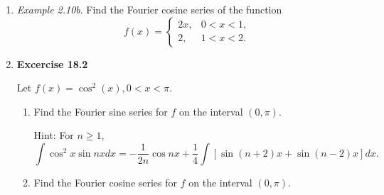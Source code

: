 \begin{enumerate}
\newpage

\item \textit{Example 2.10b}. Find the Fourier cosine series of the function
\[
f(x)=
\begin{cases}
    2x, & 0<x<1, \\
    2, & 1<x<2.
\end{cases}
\]

\newpage



\item \textbf{Excercise 18.2}

Let $f(x)=\cos^{2}(x), 0 < x < \pi$.

\begin{enumerate}
\item Find the Fourier sine series for $f$ on the interval $(0,\pi)$.

Hint: For $n\geq 1$,
\[\int \cos^{2}x\sin nx dx = -\frac{1}{2n}\cos nx + \frac{1}{4}\int [\sin (n+2)x + \sin(n-2)x ]dx.  \]
\item Find the Fourier cosine series for $f$ on the interval $(0,\pi)$.
\end{enumerate}




\end{enumerate}



